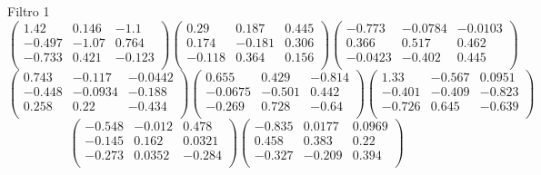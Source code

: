 Filtro 1
{ \small
\[
\begin{pmatrix}
  1.42 & 0.146 & -1.1 \\
  -0.497 & -1.07 & 0.764 \\
  -0.733 & 0.421 & -0.123 \\
\end{pmatrix}
\begin{pmatrix}
  0.29 & 0.187 & 0.445 \\
  0.174 & -0.181 & 0.306 \\
  -0.118 & 0.364 & 0.156 \\
\end{pmatrix}
\begin{pmatrix}
  -0.773 & -0.0784 & -0.0103 \\
  0.366 & 0.517 & 0.462 \\
  -0.0423 & -0.402 & 0.445 \\
\end{pmatrix}
\]
\[
\begin{pmatrix}
  0.743 & -0.117 & -0.0442 \\
  -0.448 & -0.0934 & -0.188 \\
  0.258 & 0.22 & -0.434 \\
\end{pmatrix}
\begin{pmatrix}
  0.655 & 0.429 & -0.814 \\
  -0.0675 & -0.501 & 0.442 \\
  -0.269 & 0.728 & -0.64 \\
\end{pmatrix}
\begin{pmatrix}
  1.33 & -0.567 & 0.0951 \\
  -0.401 & -0.409 & -0.823 \\
  -0.726 & 0.645 & -0.639 \\
\end{pmatrix}
\]
\[
\begin{pmatrix}
  -0.548 & -0.012 & 0.478 \\
  -0.145 & 0.162 & 0.0321 \\
  -0.273 & 0.0352 & -0.284 \\
\end{pmatrix}
\begin{pmatrix}
  -0.835 & 0.0177 & 0.0969 \\
  0.458 & 0.383 & 0.22 \\
  -0.327 & -0.209 & 0.394 \\
\end{pmatrix}
\]
}

